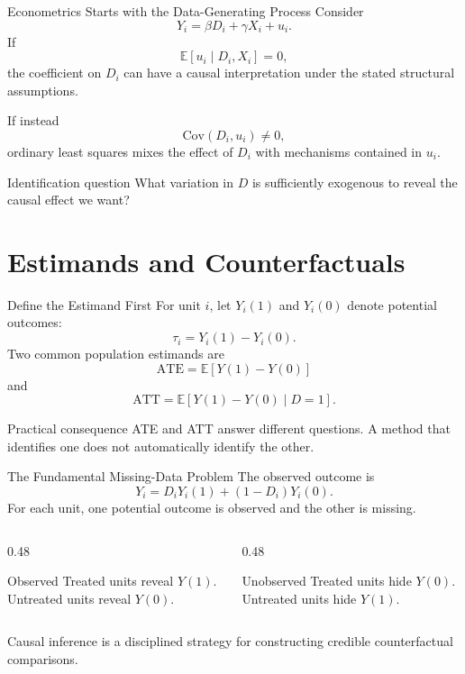 \documentclass[aspectratio=169,11pt]{beamer}
\newcommand{\E}{\mathbb{E}}
\newcommand{\Cov}{\mathrm{Cov}}
\newcommand{\ATE}{\mathrm{ATE}}
\newcommand{\ATT}{\mathrm{ATT}}
\begin{document}
\begin{frame}{Econometrics Starts with the Data-Generating Process}
Consider
\[
Y_i=\beta D_i+\gamma X_i+u_i.
\]
If
\[
\E[u_i\mid D_i,X_i]=0,
\]
the coefficient on \(D_i\) can have a causal interpretation under the stated structural assumptions.

If instead
\[
\Cov(D_i,u_i)\neq 0,
\]
ordinary least squares mixes the effect of \(D_i\) with mechanisms contained in \(u_i\).

\begin{alertblock}{Identification question}
What variation in \(D\) is sufficiently exogenous to reveal the causal effect we want?
\end{alertblock}
\end{frame}

\section{Estimands and Counterfactuals}

\begin{frame}{Define the Estimand First}
For unit \(i\), let \(Y_i(1)\) and \(Y_i(0)\) denote potential outcomes:
\[
\tau_i=Y_i(1)-Y_i(0).
\]
Two common population estimands are
\[
\ATE=\E[Y(1)-Y(0)]
\]
and
\[
\ATT=\E[Y(1)-Y(0)\mid D=1].
\]

\begin{block}{Practical consequence}
ATE and ATT answer different questions. A method that identifies one does not automatically identify the other.
\end{block}
\end{frame}

\begin{frame}{The Fundamental Missing-Data Problem}
The observed outcome is
\[
Y_i=D_iY_i(1)+(1-D_i)Y_i(0).
\]
For each unit, one potential outcome is observed and the other is missing.

\begin{columns}
\begin{column}{0.48\textwidth}
\begin{block}{Observed}
Treated units reveal \(Y(1)\).\\
Untreated units reveal \(Y(0)\).
\end{block}
\end{column}
\begin{column}{0.48\textwidth}
\begin{alertblock}{Unobserved}
Treated units hide \(Y(0)\).\\
Untreated units hide \(Y(1)\).
\end{alertblock}
\end{column}
\end{columns}

\vspace{0.3cm}
Causal inference is a disciplined strategy for constructing credible counterfactual comparisons.
\end{frame}
\end{document}
